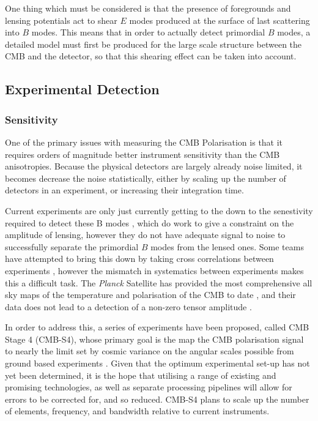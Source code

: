 {\par One thing which must be considered is that the presence of foregrounds and lensing potentials act to shear $E$ modes produced at the surface of last scattering into $B$ modes. This means that in order to actually detect primordial $B$ modes, a detailed model must first be produced for the large scale structure between the CMB and the detector, so that this shearing effect can be taken into account.

\subsection{Experimental Detection}

\subsubsection{Sensitivity}
One of the primary issues with measuring the CMB Polarisation is that it requires orders of magnitude better instrument sensitivity than the CMB anisotropies. Because the physical detectors are largely already noise limited, it becomes decrease the noise statistically, either by scaling up the number of detectors in an experiment, or increasing their integration time.

Current experiments are only just currently getting to the down to the senestivity required to detect these B modes  \cite{1412.0626} \cite{1307.5830} \cite{1403.2369}, which do work to give a constraint on the amplitude of lensing, however they do not have adequate signal to noise to successfully separate the primordial $B$ modes from the lensed ones. Some teams have attempted to bring this down by taking cross correlations between experiments \cite{1502.00612}, however the mismatch in systematics between experiments makes this a difficult task. The \textit{Planck} Satellite has provided the most comprehensive all sky maps of the temperature and polarisation of the CMB to date \cite{1807.06205}, and their data does not lead to a detection of a non-zero tensor amplitude \cite{1807.06211}.

\par In order to address this, a series of experiments have been proposed, called CMB Stage 4 (CMB-S4), whose primary goal is the map the CMB polarisation signal to nearly the limit set by cosmic variance on the angular scales possible from ground based experiments \cite{1610.02743}. Given that the optimum experimental set-up has not yet been determined, it is the hope that utilising a range of existing and promising technologies, as well as separate processing pipelines will allow for errors to be corrected for, and so reduced. CMB-S4 plans to scale up the number of elements, frequency, and bandwidth relative to current instruments.

}
